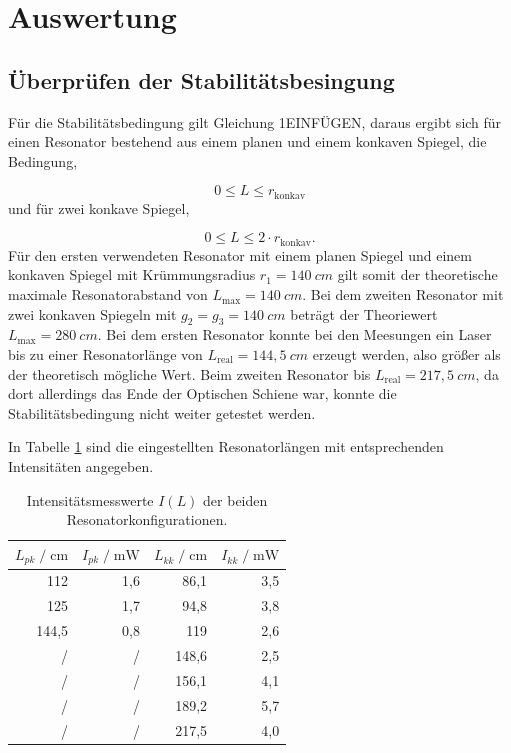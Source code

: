 \section{Auswertung}
\label{sec:Auswertung}

\subsection{Überprüfen der Stabilitätsbesingung}
\label{sec:Überprüfen der Stabilitätsbesingung}

Für die Stabilitätsbedingung gilt Gleichung 1EINFÜGEN, daraus ergibt sich für einen Resonator bestehend aus einem planen und einem konkaven Spiegel, 
die Bedingung,

\begin{equation}
\label{equ:}
  0 \leq L \leq r_{\text{konkav}}
\end{equation}
und für zwei konkave Spiegel,

\begin{equation}
\label{equ:}
  0 \leq L \leq 2 \cdot r_{\text{konkav}}.
\end{equation}
Für den ersten verwendeten Resonator mit einem planen Spiegel und einem konkaven Spiegel mit Krümmungsradius $r_1 = 140 \: cm$ gilt somit der 
theoretische maximale Resonatorabstand von $L_{\text{max}} = 140 \: cm$.
Bei dem zweiten Resonator mit zwei konkaven Spiegeln mit $g_2 = g_3 = 140 \: cm$ beträgt der Theoriewert $L_{\text{max}} = 280 \: cm$.
Bei dem ersten Resonator konnte bei den Meesungen ein Laser bis zu einer Resonatorlänge von $L_{\text{real}} = 144,5 \: cm$ erzeugt werden,
also größer als der theoretisch mögliche Wert.
Beim zweiten Resonator bis $L_{\text{real}} = 217,5 \: cm$, da dort allerdings das Ende der Optischen Schiene war, konnte die Stabilitätsbedingung nicht weiter getestet werden.

In Tabelle \ref{tab:1} sind die eingestellten Resonatorlängen mit entsprechenden Intensitäten angegeben.


\begin{table}[H]
  \centering
  \footnotesize
  \caption{Intensitätsmesswerte $I(L)$ der beiden Resonatorkonfigurationen.}
  \label{tab:1}
  \begin{tabular}{r r | r r}
  \toprule
  $L_{pk} \;/\; \si{\centi\meter}$ & $I_{pk} \;/\; \si{\milli\watt}$ & $L_{kk} \;/\; \si{\centi\meter}$ & $I_{kk} \;/\; \si{\milli\watt}$ \\
  \midrule
  112   & 1,6 & 86,1 & 3,5 \\
  125   & 1,7 & 94,8 & 3,8 \\
  144,5 & 0,8 & 119 & 2,6 \\
  /     & /   & 148,6 & 2,5 \\
  /     & /   & 156,1 & 4,1 \\  
  /     & /   & 189,2 & 5,7 \\
  /     & /   & 217,5 & 4,0 \\
  \bottomrule
  \end{tabular}
\end{table}


